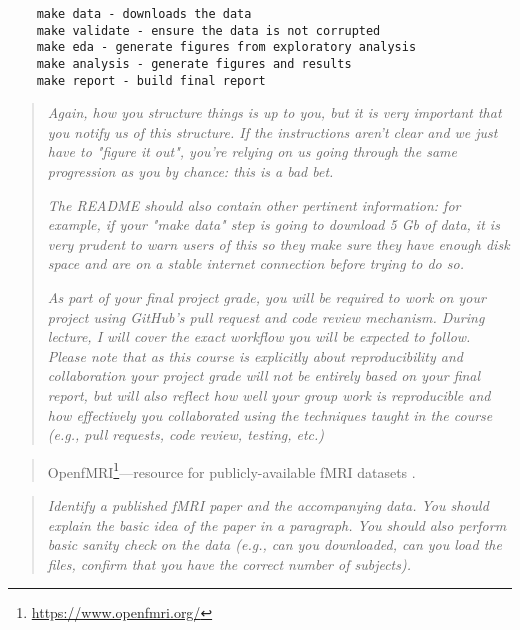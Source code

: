 \begin{verbatim}
    make data - downloads the data 
    make validate - ensure the data is not corrupted
    make eda - generate figures from exploratory analysis
    make analysis - generate figures and results
    make report - build final report
\end{verbatim}

\begin{quote}\emph{
Again, how you structure things is up to you, but it is very important that you
notify us of this structure. If the instructions aren't clear and we just have
to "figure it out", you're relying on us going through the same progression as
you by chance: this is a bad bet. 
}

\emph{
The README should also contain other pertinent information: for example, if
your "make data" step is going to download 5 Gb of data, it is very prudent to
warn users of this so they make sure they have enough disk space and are on a
stable internet connection before trying to do so.
}

\emph{
As part of your final project grade, you will be required to work on your
project using GitHub's pull request and code review mechanism.  During lecture,
I will cover the exact workflow you will be expected to follow.  Please note
that as this course is explicitly about reproducibility and collaboration your
project grade will not be entirely based on your final report, but will also
reflect how well your group work is reproducible and how effectively you
collaborated using the techniques taught in the course (e.g., pull requests,
code review, testing, etc.)
}\end{quote}

 

\begin{quote}
OpenfMRI\footnote{\url{https://www.openfmri.org/}}---resource for publicly-available fMRI datasets
\citep{poldrack2013toward,poldrack2015openfmri}.
\end{quote}


\begin{quote}\emph{
Identify a published fMRI paper and the accompanying data.
You should explain the basic idea of the paper in a paragraph.
You should also perform basic sanity check on the data
(e.g., can you downloaded, can you load the files, confirm that you have the
correct number of subjects).
}\end{quote}

